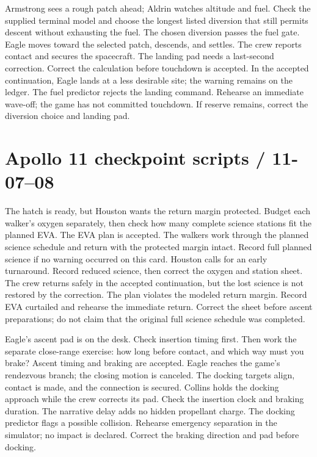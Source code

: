 {Armstrong sees a rough patch ahead; Aldrin watches altitude and fuel.
Check the supplied terminal model and choose the longest listed
diversion that still permits descent without exhausting the fuel.}
{The chosen diversion passes the fuel gate.
Eagle moves toward the selected patch, descends, and settles.
The crew reports contact and secures the spacecraft.}
{The landing pad needs a last-second correction.
Correct the calculation before touchdown is accepted.
In the accepted continuation, Eagle lands at a less desirable site;
the warning remains on the ledger.}
{The fuel predictor rejects the landing command.
Rehearse an immediate wave-off; the game has not committed touchdown.
If reserve remains, correct the diversion choice and landing pad.}

\clearpage
\section*{Apollo 11 checkpoint scripts / 11-07--08}
{The hatch is ready, but Houston wants the return margin protected.
Budget each walker's oxygen separately, then check how many
complete science stations fit the planned EVA.}
{The EVA plan is accepted. The walkers work through the planned
science schedule and return with the protected margin intact.
Record full planned science if no warning occurred on this card.}
{Houston calls for an early turnaround.
Record reduced science, then correct the oxygen and station sheet.
The crew returns safely in the accepted continuation, but the
lost science is not restored by the correction.}
{The plan violates the modeled return margin.
Record EVA curtailed and rehearse the immediate return.
Correct the sheet before ascent preparations; do not claim that
the original full science schedule was completed.}

{Eagle's ascent pad is on the desk.
Check insertion timing first. Then work the separate close-range
exercise: how long before contact, and which way must you brake?}
{Ascent timing and braking are accepted.
Eagle reaches the game's rendezvous branch; the closing motion
is canceled. The docking targets align, contact is made,
and the connection is secured.}
{Collins holds the docking approach while the crew corrects its pad.
Check the insertion clock and braking duration.
The narrative delay adds no hidden propellant charge.}
{The docking predictor flags a possible collision.
Rehearse emergency separation in the simulator; no impact is
declared. Correct the braking direction and pad before docking.}

